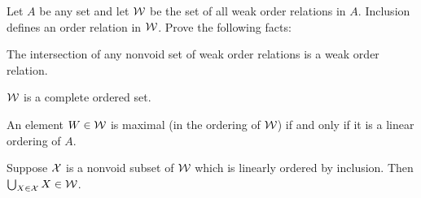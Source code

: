 \begin{exercise}
Let $A$ be any set and let $\mathcal{W}$ be the set of all weak order relations in $A$. Inclusion
defines an order relation in $\mathcal{W}$. Prove the following facts:
\begin{enumalpha}
    \item The intersection of any nonvoid set of weak order relations is a weak order relation.
    \item $\mathcal{W}$ is a complete ordered set.
    \item An element $W \in\mathcal{W}$ is maximal (in the ordering of $\mathcal{W}$) if and only if it is a linear ordering of $A$.
    \item Suppose $\mathcal{X}$ is a nonvoid subset of $\mathcal{W}$ which is linearly ordered by inclusion.
    Then $\bigcup_{X\in\mathcal{X}} X\in\mathcal{W}$.
\end{enumalpha}
\end{exercise}

